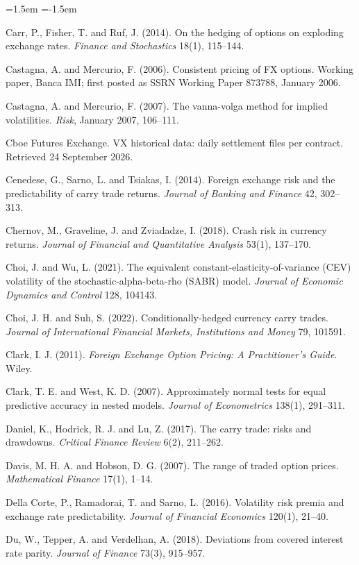 \documentclass[11pt]{article}
\theoremstyle{result}
\begin{document}
\begin{list}{}{\leftmargin=1.5em \itemindent=-1.5em \itemsep=2pt \parsep=0pt}
\item Carr, P., Fisher, T. and Ruf, J. (2014). On the hedging of options on exploding exchange rates. \emph{Finance and Stochastics} 18(1), 115--144.
\item Castagna, A. and Mercurio, F. (2006). Consistent pricing of FX options. Working paper, Banca IMI; first posted as SSRN Working Paper 873788, January 2006.
\item Castagna, A. and Mercurio, F. (2007). The vanna-volga method for implied volatilities. \emph{Risk}, January 2007, 106--111.
\item Cboe Futures Exchange. VX historical data: daily settlement files per contract. Retrieved 24 September 2026.
\item Cenedese, G., Sarno, L. and Tsiakas, I. (2014). Foreign exchange risk and the predictability of carry trade returns. \emph{Journal of Banking and Finance} 42, 302--313.
\item Chernov, M., Graveline, J. and Zviadadze, I. (2018). Crash risk in currency returns. \emph{Journal of Financial and Quantitative Analysis} 53(1), 137--170.
\item Choi, J. and Wu, L. (2021). The equivalent constant-elasticity-of-variance (CEV) volatility of the stochastic-alpha-beta-rho (SABR) model. \emph{Journal of Economic Dynamics and Control} 128, 104143.
\item Choi, J. H. and Suh, S. (2022). Conditionally-hedged currency carry trades. \emph{Journal of International Financial Markets, Institutions and Money} 79, 101591.
\item Clark, I. J. (2011). \emph{Foreign Exchange Option Pricing: A Practitioner's Guide}. Wiley.
\item Clark, T. E. and West, K. D. (2007). Approximately normal tests for equal predictive accuracy in nested models. \emph{Journal of Econometrics} 138(1), 291--311.
\item Daniel, K., Hodrick, R. J. and Lu, Z. (2017). The carry trade: risks and drawdowns. \emph{Critical Finance Review} 6(2), 211--262.
\item Davis, M. H. A. and Hobson, D. G. (2007). The range of traded option prices. \emph{Mathematical Finance} 17(1), 1--14.
\item Della Corte, P., Ramadorai, T. and Sarno, L. (2016). Volatility risk premia and exchange rate predictability. \emph{Journal of Financial Economics} 120(1), 21--40.
\item Du, W., Tepper, A. and Verdelhan, A. (2018). Deviations from covered interest rate parity. \emph{Journal of Finance} 73(3), 915--957.

\end{list}
\end{document}
